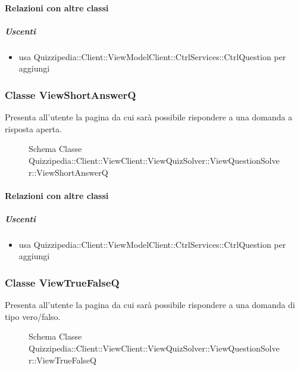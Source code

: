 \paragraph{Relazioni con altre classi}
\subparagraph{Uscenti}
\begin{itemize}
\item usa Quizzipedia::Client::ViewModelClient::CtrlServices::CtrlQuestion per aggiungi
\end{itemize}
\subsubsection{Classe ViewShortAnswerQ}
Presenta all'utente la pagina da cui sarà possibile rispondere a una domanda a risposta aperta.
\begin{figure}[H]
\centering
\noindent{}
\caption[Schema Classe ViewShortAnswerQ]{Schema Classe Quizzipedia::Client::ViewClient::ViewQuizSolver::ViewQuestionSolver::ViewShortAnswerQ}
\end{figure}
\paragraph{Relazioni con altre classi}
\subparagraph{Uscenti}
\begin{itemize}
\item usa Quizzipedia::Client::ViewModelClient::CtrlServices::CtrlQuestion per aggiungi
\end{itemize}
\subsubsection{Classe ViewTrueFalseQ}
Presenta all'utente la pagina da cui sarà possibile rispondere a una domanda di tipo vero/falso.
\begin{figure}[H]
\centering
\noindent{}
\caption[Schema Classe ViewTrueFalseQ]{Schema Classe Quizzipedia::Client::ViewClient::ViewQuizSolver::ViewQuestionSolver::ViewTrueFalseQ}
\end{figure}
